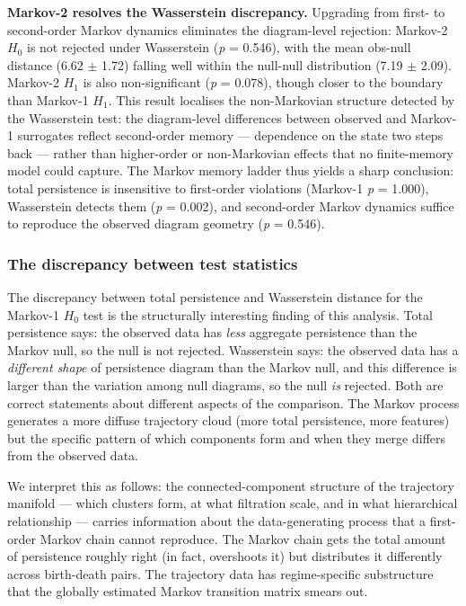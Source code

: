 \textbf{Markov-2 resolves the Wasserstein discrepancy.} Upgrading from first- to second-order Markov dynamics eliminates the diagram-level rejection: Markov-2 $H_0$ is not rejected under Wasserstein (\textit{p} = 0.546), with the mean obs-null distance (6.62 $\pm$ 1.72) falling well within the null-null distribution (7.19 $\pm$ 2.09). Markov-2 $H_1$ is also non-significant (\textit{p} = 0.078), though closer to the boundary than Markov-1 $H_1$. This result localises the non-Markovian structure detected by the Wasserstein test: the diagram-level differences between observed and Markov-1 surrogates reflect second-order memory --- dependence on the state two steps back --- rather than higher-order or non-Markovian effects that no finite-memory model could capture. The Markov memory ladder thus yields a sharp conclusion: total persistence is insensitive to first-order violations (Markov-1 \textit{p} = 1.000), Wasserstein detects them (\textit{p} = 0.002), and second-order Markov dynamics suffice to reproduce the observed diagram geometry (\textit{p} = 0.546).

\subsubsection{The discrepancy between test statistics}

The discrepancy between total persistence and Wasserstein distance for the Markov-1 $H_0$ test is the structurally interesting finding of this analysis. Total persistence says: the observed data has \textit{less} aggregate persistence than the Markov null, so the null is not rejected. Wasserstein says: the observed data has a \textit{different shape} of persistence diagram than the Markov null, and this difference is larger than the variation among null diagrams, so the null \textit{is} rejected. Both are correct statements about different aspects of the comparison. The Markov process generates a more diffuse trajectory cloud (more total persistence, more features) but the specific pattern of which components form and when they merge differs from the observed data.

We interpret this as follows: the connected-component structure of the trajectory manifold --- which clusters form, at what filtration scale, and in what hierarchical relationship --- carries information about the data-generating process that a first-order Markov chain cannot reproduce. The Markov chain gets the total amount of persistence roughly right (in fact, overshoots it) but distributes it differently across birth-death pairs. The trajectory data has regime-specific substructure that the globally estimated Markov transition matrix smears out.


